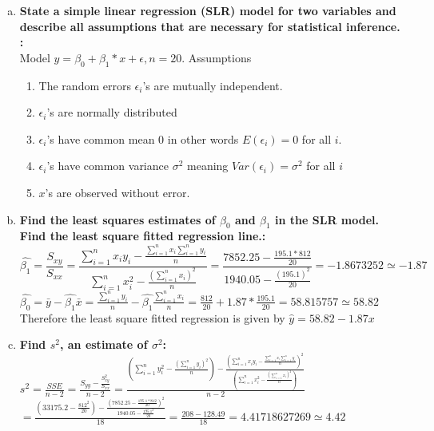 \documentclass{article}
\begin{document}
\begin{enumerate}[1.]
\begin{enumerate}[(a)]
{between the treadmill time (x) and 10-km running time (y). Does the scatter plot suggest
an approximate linear relationship between the two variables?: }
See SAS output attatched \\
  \item \textbf{State a simple linear regression (SLR) model for two variables and describe all assumptions that are necessary for statistical inference.
: } \\
Model $y = \beta_0 + \beta_1 * x+ \epsilon, n = 20$.
Assumptions
  \begin{enumerate}[(1)]
   \item The random errors $\epsilon_i$'s are mutually independent.
   \item $\epsilon_i$'s are normally distributed
   \item $\epsilon_i$'s have common mean 0 in other words $E(\epsilon_i) = 0$ for all $i$.
   \item $\epsilon_i$'s have common variance $\sigma^2$ meaning $Var(\epsilon_i) = \sigma^2$ for all $i$
  \item $x$'s are observed without error.
\end{enumerate}
  \item \textbf{Find the least squares estimates of $\beta_0$ and $\beta_1$ in the SLR model. Find the least square
fitted regression line.: } \\
\begingroup
\Large
\begin{equation}
\hat{\beta_1} = \frac{S_{xy}}{S_{xx}} = \frac{  \sum_{i=1}^{n}{x_iy_i }  - \frac{  \sum_{i=1}^{n}{x_i}  \sum_{i=1}^{n}{y_i}  }{n} }
{  \sum_{i=1}^{n}{x_{i}^2} - \frac{    (\sum_{i=1}^{n}{x_i})^2    }{ n }}   = \frac{ 7852.25 - \frac{195.1 * 812}{20}  }{ 1940.05 - \frac{(195.1)^2 }{20} }  = -1.8673252 \simeq -1.87  \nonumber
\end{equation}
$\hat{\beta_0} = \bar{y} - \hat{\beta_1}\bar{x} = \frac{ \sum_{i=1}^{n}{y_i} }{n} - \hat{\beta_1}\frac{\sum_{i=1}^{n}{x_i} }{n} = \frac{812}{20} + 1.87 * \frac{195.1}{20} = 58.815757 \simeq 58.82 $
\endgroup
Therefore the least square fitted regression is given by $\hat{y} = 58.82 - 1.87x$ 

\item \textbf{Find $s^2$, an estimate of $\sigma^2$: } \\

\begingroup
\Large
$s^2 = \frac{SSE}{n-2} = \frac{S_{yy} - \frac{S_{xy}^2}{S_{xx}}}{n-2} = \frac{            (\sum_{i=1}^{n}{y_i^2} - \frac{ (\sum_{i=1}^{n}{y_i})^2}{n} )  - 
\frac{   ( \sum_{i=1}^{n}{x_iy_i }  - \frac{  \sum_{i=1}^{n}{x_i}  \sum_{i=1}^{n}{y_i}  }{n})^2     }
{    (\sum_{i=1}^{n}{x_i^2} - \frac{ (\sum_{i=1}^{n}{x_i})^2}{n} )     }}
{n - 2}$ \\
$ = \frac{ (33175.2 - \frac{812^2}{20}) - \frac{ (7852.25 - \frac{195.1 * 812}{20})^2}{1940.05-\frac{195.1^2}{20}}  }{18} = \frac{208 - 128.49}{18} = 4.41718627269 \simeq 4.42 $
\endgroup


\end{enumerate}
\end{enumerate}
\end{document}
